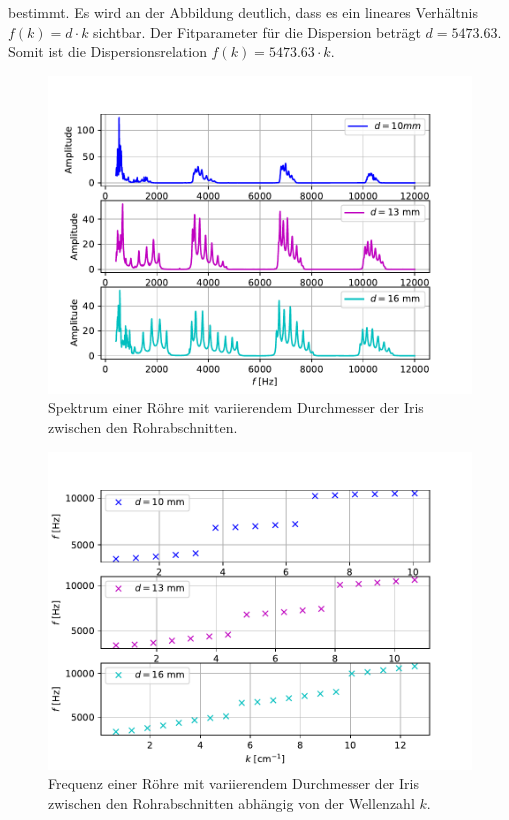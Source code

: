 bestimmt. Es wird an der Abbildung deutlich, dass es ein lineares Verhältnis $f(k)=d\cdot k$ sichtbar. Der Fitparameter für die Dispersion beträgt $d=5473.63$.
Somit ist die Dispersionsrelation $f(k)=5473.63\cdot k$.
\begin{figure}
  \centering
  \includegraphics[scale=0.5]{Messwerte/plot6.pdf}
  \caption{Spektrum einer Röhre mit variierendem Durchmesser der Iris zwischen den Rohrabschnitten.}
  \label{fig:plot6}
\end{figure}
\begin{figure}
  \centering
  \includegraphics[scale=0.5]{Messwerte/plot7.pdf}
  \caption{Frequenz einer Röhre mit variierendem Durchmesser der Iris zwischen den Rohrabschnitten abhängig von der Wellenzahl $k$.}
  \label{fig:plot7}
\end{figure}
